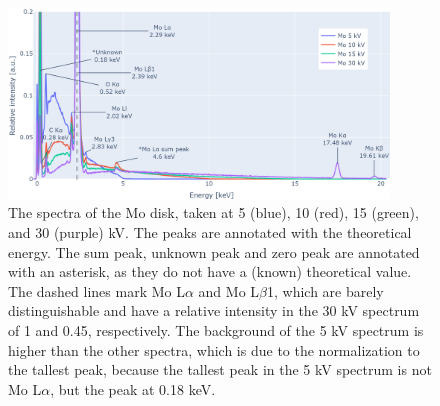\begin{figure}[h]
    \centering
    \includegraphics[width=0.90\textwidth]{figures/each_spectra/Mo_everything.png}
    \caption{
        The spectra of the Mo disk, taken at 5 (blue), 10 (red), 15 (green), and 30 (purple) kV.
        The peaks are annotated with the theoretical energy.
        The sum peak, unknown peak and zero peak are annotated with an asterisk, as they do not have a (known) theoretical value.
        The dashed lines mark Mo L$\alpha$ and Mo L$\beta$1, which are barely distinguishable and have a relative intensity in the 30 kV spectrum of 1 and 0.45, respectively.
        The background of the 5 kV spectrum is higher than the other spectra, which is due to the normalization to the tallest peak, because the tallest peak in the 5 kV spectrum is not Mo L$\alpha$, but the peak at 0.18 keV.
    }
    \label{fig:results:Spectra_Mo}
\end{figure}

